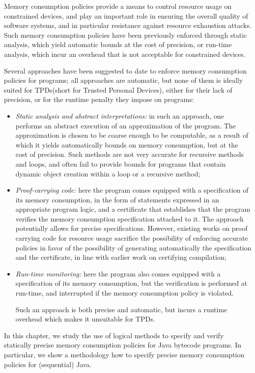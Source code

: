 
Memory consumption policies provide a means to control
resource usage on constrained devices, and play an important role
in ensuring the overall quality of software systems, and in
particular resistance against resource exhaustion attacks. Such
memory consumption policies have been previously enforced through
static analysis, which yield automatic bounds at the
cost of precision, or run-time analysis, which incur an overhead
that is not acceptable for constrained devices.

Several approaches have been suggested to date to enforce memory
consumption policies for programs; all approaches are automatic,
but none of them is ideally suited for TPDs(short for Trusted Personal Devices), either for their lack of precision, or for the runtime penalty they impose on
programs:
\begin{itemize}
\item \emph{Static analysis and abstract interpretations:} in such an
approach, one performs an abstract execution of an approximation of
the program. The approximation is chosen to be coarse enough to be
computable, as a result of which it yields automatically bounds on
memory consumption, but at the cost of precision. Such methods are not
very accurate for recursive methods and loops, and often fail to
provide bounds for programs that contain dynamic object creation
within a loop or a recursive method;


\item \emph{Proof-carrying code:} here the program
comes equipped with a specification of its memory consumption, in the
form of statements expressed in an appropriate program logic, and a
certificate that establishes that the program verifies the memory
consumption specification attached to it. The approach potentially
allows for precise specifications. However, existing works on proof
carrying code for resource usage sacrifice the possibility of
enforcing accurate policies in favor of the possibility of generating
automatically the specification and the certificate, in line with
earlier work on certifying compilation;

\item \emph{Run-time monitoring:} here the program also comes equipped
with a specification of its memory consumption, but the verification
is performed at run-time, and interrupted if the memory consumption
policy is violated.
 


Such an approach is both precise and automatic, but incurs a runtime
overhead which makes it unsuitable for TPDs.
\end{itemize}
In this chapter, we study the use of logical methods to specify and
verify statically precise memory consumption policies for Java
bytecode programs. In particular, we show a methodology how 
to specify precise memory consumption policies
for (sequential) Java.%


